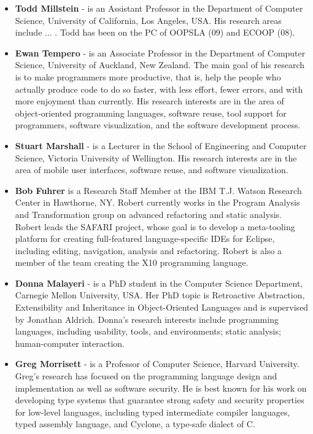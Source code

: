\documentclass{acm_proc_article-sp}
\begin{document}
\begin{itemize}
\item \textbf{Todd Millstein} - is an Assistant Professor in the Department of Computer Science, University of California, Los Angeles, USA. His research areas include ... . Todd has been on the PC of OOPSLA (09) and ECOOP (08).

\item \textbf{Ewan Tempero} - is an Associate Professor in the Department of Computer Science, University of Auckland, New Zealand. The main goal of his research is to make programmers more productive, that is, help the people who actually produce code to do so faster, with less effort, fewer errors, and with more enjoyment than currently. His research interests are in the area of object-oriented programming languages, software reuse, tool support for programmers, software visualization, and the software development process.

\item \textbf{Stuart Marshall} - is a Lecturer in the School of Engineering and Computer Science, Victoria University of Wellington. His research interests are in the area of mobile user interfaces, software reuse, and software visualization.

\item \textbf{Bob Fuhrer} is a Research Staff Member at the IBM T.J. Watson Research Center in Hawthorne, NY. Robert currently works in the Program Analysis and Transformation group on advanced refactoring and static analysis. Robert leads the SAFARI project, whose goal is to develop a meta-tooling platform for creating full-featured language-specific IDEs for Eclipse, including editing, navigation, analysis and refactoring. Robert is also a member of the team creating the X10 programming language.

\item \textbf{Donna Malayeri} - is a PhD student in the Computer Science Department, Carnegie Mellon University, USA. Her PhD topic is Retroactive Abstraction, Extensibility and Inheritance in Object-Oriented Languages and is supervised by Jonathan Aldrich. Donna's research interests include programming languages, including usability, tools, and environments; static analysis;  human-computer interaction. 

\item \textbf{Greg Morrisett} - is a Professor of Computer Science, Harvard University. Greg's research has focused on the programming language design and implementation as well as software security.  He is best known for his work on developing type systems that guarantee strong safety and security properties for low-level languages, including typed intermediate compiler languages, typed assembly language, and Cyclone, a type-safe dialect of C.


\end{itemize}
\end{document}
